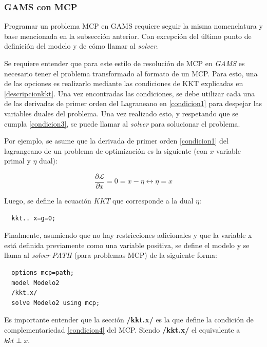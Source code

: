 \subsubsection{GAMS con MCP}

Programar un problema MCP en GAMS requiere seguir la misma nomenclatura y base mencionada en la subsección anterior. Con excepción del último punto de definición del modelo y de cómo llamar al \textit{solver}. 
\vspace{2.5mm}

Se requiere entender que para este estilo de resolución de MCP en \textit{GAMS} es necesario tener el problema transformado al formato de un MCP. Para esto, una de las opciones es realizarlo mediante las condiciones de KKT explicadas en \ref{descripcionkkt}. Una vez encontradas las condiciones, se debe utilizar cada una de las derivadas de primer orden del Lagraneano en \ref{condicion1} para despejar las variables duales del problema. Una vez realizado esto, y respetando que se cumpla \ref{condicion3}, se puede llamar al \textit{solver} para solucionar el problema. 
\vspace{2.5mm}

Por ejemplo, se asume que la derivada de primer orden \ref{condicion1} del lagrangeano de un problema de optimización es la siguiente (con $x$ variable primal y $\eta$ dual):

$$\frac{\partial \mathcal{L}}{\partial x}=0=x-\eta \leftrightarrow \eta=x$$

Luego, se define la ecuación $KKT$ que corresponde a la dual $\eta$:

\begin{footnotesize}
\begin{lstlisting}
  kkt.. x=g=0;
 \end{lstlisting}
\end{footnotesize}


Finalmente, asumiendo que no hay restricciones adicionales y que la variable x está definida previamente como una variable positiva, se define el modelo y se llama al \textit{solver} \textit{PATH} (para problemas MCP) de la siguiente forma:

\begin{footnotesize}
\begin{lstlisting}
  options mcp=path;
  model Modelo2
  /kkt.x/
  solve Modelo2 using mcp;
\end{lstlisting}
\end{footnotesize}


Es importante entender que la sección \textbf{/kkt.x/} es la que define la condición de complementariedad \ref{condicion4} del MCP. Siendo \textbf{/kkt.x/} el equivalente a  $kkt \perp x$. 

